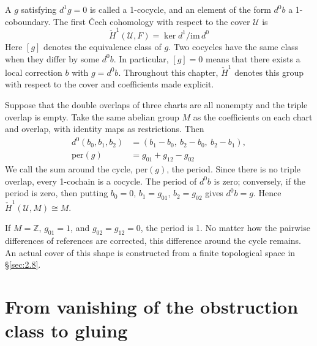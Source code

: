 \begin{definition}\label{def:2.18}

A $g$ satisfying $d^1g=0$ is called a 1-cocycle, and an element of the form $d^0b$ a
1-coboundary. The first \v{C}ech cohomology with respect to the cover $\mathcal{U}$ is
\begin{equation*}
\check H^1(\mathcal{U},F)=\ker d^1/\mathrm{im}\,d^0
\tag{2.12}\label{eq:2.12}
\end{equation*}
Here $[g]$ denotes the equivalence class of $g$. Two cocycles have the same class when
they differ by some $d^0b$. In particular, $[g]=0$ means that there exists a local
correction $b$ with $g=d^0b$. Throughout this chapter, $\check H^1$ denotes this group
with respect to the cover and coefficients made explicit.

\end{definition}

\begin{example}\label{ex:2.19}

Suppose that the double overlaps of three charts are all nonempty and the triple overlap
is empty. Take the same abelian group $M$ as the coefficients on each chart and overlap,
with identity maps as restrictions. Then
\begin{equation*}
\begin{aligned}
d^0(b_0,b_1,b_2)&=(b_1-b_0,\ b_2-b_0,\ b_2-b_1),\\
\mathrm{per}(g)&=g_{01}+g_{12}-g_{02}
\end{aligned}
\tag{2.13}\label{eq:2.13}
\end{equation*}
We call the sum around the cycle, $\mathrm{per}(g)$, the period. Since there is no triple
overlap, every 1-cochain is a cocycle. The period of $d^0b$ is zero; conversely, if the
period is zero, then putting $b_0=0$, $b_1=g_{01}$, $b_2=g_{02}$ gives $d^0b=g$. Hence
$\check H^1(\mathcal{U},M)\cong M$.

If $M=\mathbb{Z}$, $g_{01}=1$, and $g_{02}=g_{12}=0$, the period is 1. No matter how
the pairwise differences of references are corrected, this difference around the cycle
remains. An actual cover of this shape is constructed from a finite topological space in
\S\ref{sec:2.8}.

\end{example}

\section{From vanishing of the obstruction class to gluing}\label{sec:2.5}

